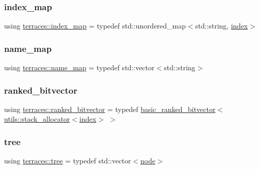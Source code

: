 \subsubsection{\texorpdfstring{index\+\_\+map}{index\_map}}
{\footnotesize\ttfamily using \hyperlink{namespaceterraces_a148f3e895119c2a72d995caae669e40d}{terraces\+::index\+\_\+map} = typedef std\+::unordered\+\_\+map$<$std\+::string, \hyperlink{namespaceterraces_adbc33ccb543d1634e96d0eb02e472c77}{index}$>$}

\mbox{\label{namespaceterraces_a4ef0217fe5aed881737d9bc5a8d45dca}} 
\subsubsection{\texorpdfstring{name\+\_\+map}{name\_map}}
{\footnotesize\ttfamily using \hyperlink{namespaceterraces_a4ef0217fe5aed881737d9bc5a8d45dca}{terraces\+::name\+\_\+map} = typedef std\+::vector$<$std\+::string$>$}

\mbox{\label{namespaceterraces_acc45ec9c561024c50ecbce5b6738ba08}} 
\subsubsection{\texorpdfstring{ranked\+\_\+bitvector}{ranked\_bitvector}}
{\footnotesize\ttfamily using \hyperlink{namespaceterraces_acc45ec9c561024c50ecbce5b6738ba08}{terraces\+::ranked\+\_\+bitvector} = typedef \hyperlink{classterraces_1_1basic__ranked__bitvector}{basic\+\_\+ranked\+\_\+bitvector}$<$\hyperlink{classterraces_1_1utils_1_1stack__allocator}{utils\+::stack\+\_\+allocator}$<$\hyperlink{namespaceterraces_adbc33ccb543d1634e96d0eb02e472c77}{index}$>$ $>$}

\mbox{\label{namespaceterraces_a07aaf7feec4a22c6cdefc14c5a81bdd0}} 
\subsubsection{\texorpdfstring{tree}{tree}}
{\footnotesize\ttfamily using \hyperlink{namespaceterraces_a07aaf7feec4a22c6cdefc14c5a81bdd0}{terraces\+::tree} = typedef std\+::vector$<$\hyperlink{structterraces_1_1node}{node}$>$}



